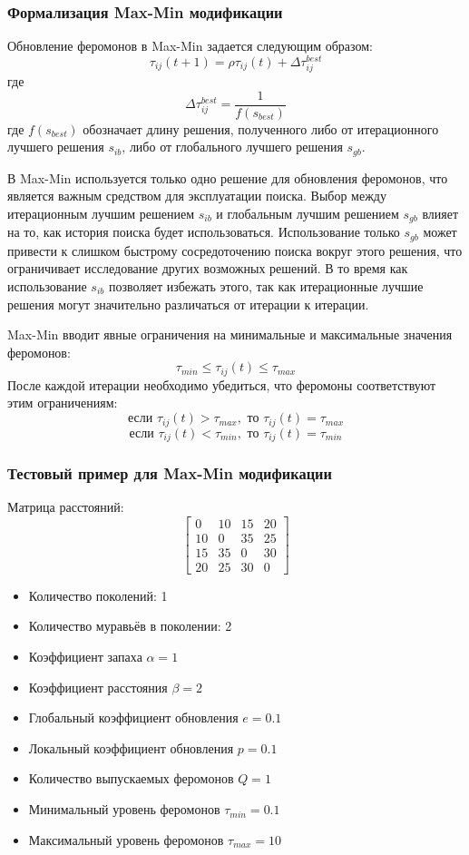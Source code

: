 \documentclass[14pt]{article}
\begin{document}
\subsubsection{Формализация Max-Min модификации}

Обновление феромонов в Max-Min задается следующим образом:
\[
\tau_{ij}(t + 1) = \rho \tau_{ij}(t) + \Delta \tau_{ij}^{best}
\]
где
\[
\Delta \tau_{ij}^{best} = \frac{1}{f(s_{best})}
\]
где \( f(s_{best}) \) обозначает длину решения, полученного либо от итерационного лучшего решения \( s_{ib} \), либо от глобального лучшего решения \( s_{gb} \).

В Max-Min используется только одно решение для обновления феромонов, что является важным средством для эксплуатации поиска. Выбор между итерационным лучшим решением \( s_{ib} \) и глобальным лучшим решением \( s_{gb} \) влияет на то, как история поиска будет использоваться. Использование только \( s_{gb} \) может привести к слишком быстрому сосредоточению поиска вокруг этого решения, что ограничивает исследование других возможных решений. В то время как использование \( s_{ib} \) позволяет избежать этого, так как итерационные лучшие решения могут значительно различаться от итерации к итерации.

Max-Min вводит явные ограничения на минимальные и максимальные значения феромонов:
\[
\tau_{min} \leq \tau_{ij}(t) \leq \tau_{max}
\]
После каждой итерации необходимо убедиться, что феромоны соответствуют этим ограничениям:
\[
\text{если } \tau_{ij}(t) > \tau_{max}, \text{ то } \tau_{ij}(t) = \tau_{max}
\]
\[
\text{если } \tau_{ij}(t) < \tau_{min}, \text{ то } \tau_{ij}(t) = \tau_{min}
\]

\subsubsection{Тестовый пример для Max-Min модификации}

Матрица расстояний:
\[
\begin{bmatrix}
0 & 10 & 15 & 20 \\
10 & 0 & 35 & 25 \\
15 & 35 & 0 & 30 \\
20 & 25 & 30 & 0
\end{bmatrix}
\]

\begin{itemize}
    \item Количество поколений: 1
    \item Количество муравьёв в поколении: 2
    \item Коэффициент запаха $\alpha = 1$
    \item Коэффициент расстояния $\beta = 2$
    \item Глобальный коэффициент обновления $e = 0.1$
    \item Локальный коэффициент обновления $p = 0.1$
    \item Количество выпускаемых феромонов $Q = 1$
    \item Минимальный уровень феромонов $\tau_{min} = 0.1$
    \item Максимальный уровень феромонов $\tau_{max} = 10$
\end{itemize}
\end{document}
